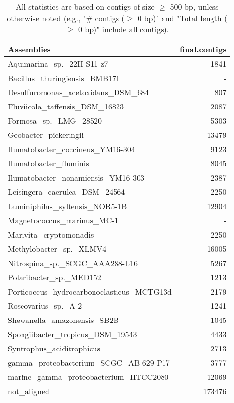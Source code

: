 \documentclass[12pt,a4paper]{article}
\begin{document}
\begin{table}[ht]
\begin{center}
\caption{All statistics are based on contigs of size $\geq$ 500 bp, unless otherwise noted (e.g., "\# contigs ($\geq$ 0 bp)" and "Total length ($\geq$ 0 bp)" include all contigs).}
\begin{tabular}{|l*{1}{|r}|}
\hline
Assemblies & final.contigs \\ \hline
Aquimarina\_sp.\_22II-S11-z7 & 1841 \\ \hline
Bacillus\_thuringiensis\_BMB171 & - \\ \hline
Desulfuromonas\_acetoxidans\_DSM\_684 & 807 \\ \hline
Fluviicola\_taffensis\_DSM\_16823 & 2087 \\ \hline
Formosa\_sp.\_LMG\_28520 & 5303 \\ \hline
Geobacter\_pickeringii & 13479 \\ \hline
Ilumatobacter\_coccineus\_YM16-304 & 9123 \\ \hline
Ilumatobacter\_fluminis & 8045 \\ \hline
Ilumatobacter\_nonamiensis\_YM16-303 & 2387 \\ \hline
Leisingera\_caerulea\_DSM\_24564 & 2250 \\ \hline
Luminiphilus\_syltensis\_NOR5-1B & 12904 \\ \hline
Magnetococcus\_marinus\_MC-1 & - \\ \hline
Marivita\_cryptomonadis & 2250 \\ \hline
Methylobacter\_sp.\_XLMV4 & 16005 \\ \hline
Nitrospina\_sp.\_SCGC\_AAA288-L16 & 5267 \\ \hline
Polaribacter\_sp.\_MED152 & 1213 \\ \hline
Porticoccus\_hydrocarbonoclasticus\_MCTG13d & 2179 \\ \hline
Roseovarius\_sp.\_A-2 & 1241 \\ \hline
Shewanella\_amazonensis\_SB2B & 1045 \\ \hline
Spongiibacter\_tropicus\_DSM\_19543 & 4433 \\ \hline
Syntrophus\_aciditrophicus & 2713 \\ \hline
gamma\_proteobacterium\_SCGC\_AB-629-P17 & 3777 \\ \hline
marine\_gamma\_proteobacterium\_HTCC2080 & 12069 \\ \hline
not\_aligned & 173476 \\ \hline
\end{tabular}
\end{center}
\end{table}
\end{document}
